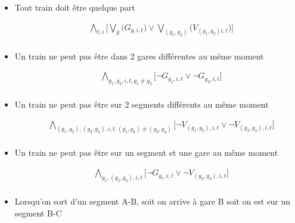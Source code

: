 \documentclass[a4paper]{article}
\begin{document}
\begin{itemize}

\item Tout train doit être quelque part

\begin{equation*}
    \begin{split}
      & \bigwedge_{t, i}
      \big[\bigvee_{g} \big(G_{g, i, t} \big) \lor \bigvee_{(g_1, g_2)} \big(V_{(g_1, g_2) i, t} \big) \big] \\
    \end{split}
    \end{equation*}


\item Un train ne peut pas être dans 2 gares différentes au même moment

\begin{equation*}
    \begin{split}
      & \bigwedge_{g_1, g_2, i, t, g_1 \neq g_2 }
      \big[\neg G_{g_1, i, t} \lor \neg G_{g_2, i, t} \big] \\
    \end{split}
    \end{equation*}
    
\item Un train ne peut pas être sur 2 segments différents au même moment

\begin{equation*}
    \begin{split}
      & 
      \bigwedge_{(g_1, g_2), (g_3, g_4), i, t, (g_1, g_2) \neq (g_3, g_4) }
      \big[\neg V_{(g_1, g_2), i, t} \lor \neg V_{(g_3, g_4), i, t} \big] \\
    \end{split}
    \end{equation*}

\item Un train ne peut pas être sur un segment et une gare au même moment

\begin{equation*}
    \begin{split}
      & \bigwedge_{g_1, (g_2, g_3), i, t}
      \big[\neg G_{g_1, i, t} \lor \neg V_{(g_2, g_3), i, t} \big] \\
    \end{split}
    \end{equation*}


\item Lorsqu'on sort d'un segment A-B, soit on arrive à gare B soit on est sur un segment B-C


\end{itemize}
\end{document}
